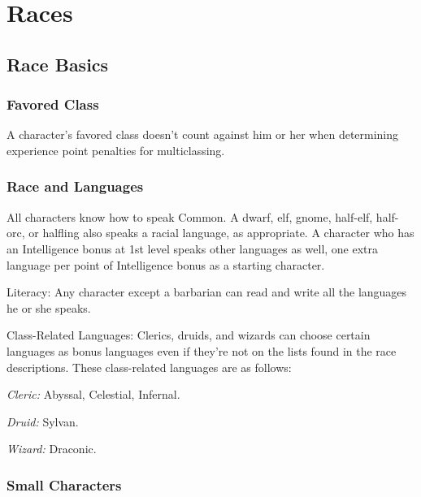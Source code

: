 \chapter{Races}\label{chapter:Races}

\section{Race Basics}

\subsection{Favored Class}

A character's favored class doesn't count against him or her when determining experience 
point penalties for multiclassing. 

\subsection{Race and Languages}

All characters know how to speak Common. A dwarf, elf, gnome, half-elf, half-orc, 
or halfling also speaks a racial language, as appropriate. A character who has 
an Intelligence bonus at 1st level speaks other languages as well, one extra language 
per point of Intelligence bonus as a starting character. 

Literacy: Any character except a barbarian can read and write all the languages 
he or she speaks.

Class-Related Languages: Clerics, druids, and wizards can choose certain languages 
as bonus languages even if they're not on the lists found in the race descriptions. 
These class-related languages are as follows:

\textit{Cleric:} Abyssal, Celestial, Infernal.

\textit{Druid:} Sylvan.

\textit{Wizard:} Draconic.

\subsection{Small Characters}

